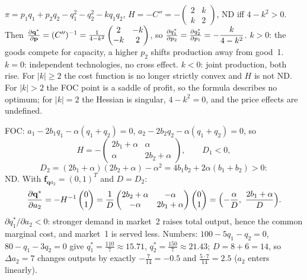\begin{solutions}
  \item $\pi=p_1q_1+p_2q_2-q_1^{2}-q_2^{2}-kq_1q_2$, $H=-C''
        =-\begin{pmatrix}2&k\\k&2\end{pmatrix}$, ND iff $4-k^{2}>0$. Then
        $\frac{\partial \mathbf{q}^*}{\partial \mathbf{p}}=(C'')^{-1}
        =\frac{1}{4-k^{2}}\begin{pmatrix}2&-k\\-k&2\end{pmatrix}$, so
        $\frac{\partial q_1^*}{\partial p_2}=\frac{\partial q_2^*}{\partial p_1}=-\dfrac{k}{4-k^{2}}$. $k>0$:
        the goods compete for capacity, a higher $p_2$ shifts production
        away from good~1. $k=0$: independent technologies, no cross effect.
        $k<0$: joint production, both rise. For $|k|\ge2$ the cost function
        is no longer strictly convex and $H$ is not ND. For $|k|>2$ the
        FOC point is a saddle of profit, so the formula describes no
        optimum; for $|k|=2$ the Hessian is singular, $4-k^{2}=0$, and the
        price effects are undefined.

  \item FOC: $a_1-2b_1q_1-\alpha(q_1+q_2)=0$,
        $a_2-2b_2q_2-\alpha(q_1+q_2)=0$, so
        \[
          H=-\begin{pmatrix}2b_1+\alpha&\alpha\\\alpha&2b_2+\alpha\end{pmatrix},
          \qquad D_1<0,
        \]
        \[
          D_2=(2b_1+\alpha)(2b_2+\alpha)-\alpha^{2}
          =4b_1b_2+2\alpha(b_1+b_2)>0 :
        \]
        ND. With $\mathbf{f}_{\mathbf{q}a_2}=(0,1)^{T}$ and $D=D_2$:
        \[
          \pd{\mathbf{q}^*}{a_2}=-H^{-1}\begin{pmatrix}0\\1\end{pmatrix}
          =\frac1D\begin{pmatrix}2b_2+\alpha&-\alpha\\-\alpha&2b_1+\alpha\end{pmatrix}
          \begin{pmatrix}0\\1\end{pmatrix}
          =\Bigl(-\frac{\alpha}{D},\ \frac{2b_1+\alpha}{D}\Bigr).
        \]
        $\partial q_1^*/\partial a_2<0$: stronger demand in market~2 raises
        total output, hence the common marginal cost, and market~1 is
        served less. Numbers: $100-5q_1-q_2=0$, $80-q_1-3q_2=0$ give
        $q_1^*=\tfrac{110}{7}\approx15.71$, $q_2^*=\tfrac{150}{7}\approx21.43$;
        $D=8+6=14$, so $\Delta a_2=7$ changes outputs by exactly
        $-\tfrac{7}{14}=-0.5$ and $\tfrac{5\cdot7}{14}=2.5$ ($a_2$ enters
        linearly).
\end{solutions}

